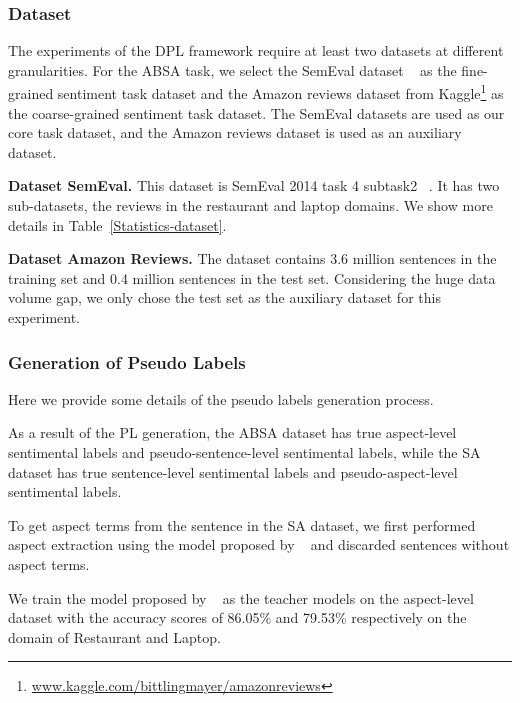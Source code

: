 \documentclass[11pt]{article}
\begin{document}
\subsubsection{Dataset}
The experiments of the DPL framework require at least two datasets at different granularities.
For the ABSA task, we select the SemEval dataset ~\cite{pontikisemeval} as the fine-grained sentiment task dataset and the Amazon reviews dataset from Kaggle\footnote{\url{www.kaggle.com/bittlingmayer/amazonreviews}} as the coarse-grained sentiment task dataset. The SemEval datasets are used as our core task dataset, and the Amazon reviews dataset is used as an auxiliary dataset.








\textbf{Dataset SemEval.}
This dataset is SemEval 2014 task 4 subtask2 ~\cite{pontikisemeval}.
It has two sub-datasets, the reviews in the restaurant and laptop domains.
We show more details in Table~\ref{Statistics-dataset}. 



\textbf{Dataset Amazon Reviews.}
The dataset contains 3.6 million sentences in the training set and 0.4 million sentences in the test set. Considering the huge data volume gap, we only chose the test set as the auxiliary dataset for this experiment. 









\subsubsection{Generation of Pseudo Labels}
Here we provide some details of the pseudo labels generation process.



As a result of the PL generation, the ABSA dataset has true aspect-level sentimental labels and pseudo-sentence-level sentimental labels, while the SA dataset has true sentence-level sentimental labels and pseudo-aspect-level sentimental labels.

To get aspect terms from the sentence in the SA dataset, we first performed aspect extraction using the model proposed by ~\citet{li-etal-2019-exploiting} and discarded sentences without aspect terms.


We train the model proposed by ~\cite{bai2020investigating} as the teacher models on the aspect-level dataset with the accuracy scores of 86.05\% and 79.53\% respectively on the domain of Restaurant and Laptop.
\end{document}
